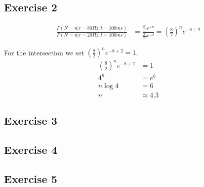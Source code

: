 \documentclass[../main/Notes.tex]{subfiles}
\begin{document}
\subsection*{Exercise 2}
\begin{align*}
\frac{P(N=n|r=80 Hz, t = 100 ms)}{P(N=n|r=20 Hz, t = 100 ms)} &= \frac{ \frac{8^n}{n!}e^{-8} }{ \frac{2^n}{n!} e^{-2} } = \left(\frac{8}{2}\right)^n e^{-8+2}
\end{align*}

For the intersection we set $\left(\frac{8}{2}\right)^n e^{-8+2} = 1$.
\begin{align*}
\left(\frac{8}{2}\right)^n e^{-8+2} &= 1\\
4^n &= e^6 \\
n \log 4 &= 6 \\
n &\approx 4.3
\end{align*}

\subsection*{Exercise 3}


\subsection*{Exercise 4}


\subsection*{Exercise 5}
\end{document}
